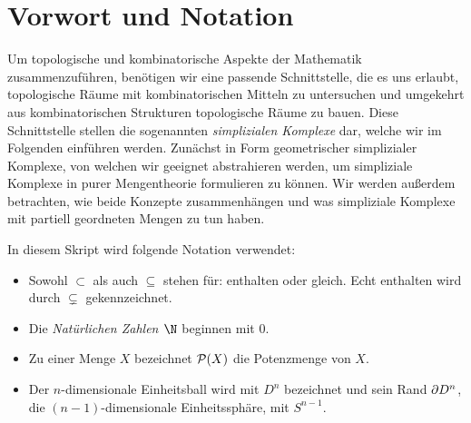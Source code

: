
\chapter{Vorwort und Notation}
Um topologische und kombinatorische Aspekte der Mathematik zusammenzuführen,
benötigen wir eine passende Schnittstelle, die es uns erlaubt, topologische
Räume mit kombinatorischen Mitteln zu untersuchen und umgekehrt aus
kombinatorischen Strukturen topologische Räume zu bauen. Diese Schnittstelle
stellen die sogenannten \emph{simplizialen Komplexe} dar, welche wir im
Folgenden einführen werden. Zunächst in Form geometrischer simplizialer
Komplexe, von welchen wir geeignet abstrahieren werden, um simpliziale Komplexe
in purer Mengentheorie formulieren zu können. Wir werden außerdem betrachten,
wie beide Konzepte zusammenhängen und was simpliziale Komplexe mit partiell
geordneten Mengen zu tun haben.


\bigskip
In diesem Skript wird folgende Notation verwendet:
\begin{itemize}
    \item
        Sowohl $\subset$ als auch $\subseteq$ stehen für: enthalten oder gleich.
        Echt enthalten wird durch $\subsetneq$ gekennzeichnet.
    
    \item
        Die \emph{Natürlichen Zahlen $\N$} beginnen mit $0$.
        
    \item
        Zu einer Menge $X$ bezeichnet $\operatorname{\mathcal{P}}(X)$ die Potenzmenge von $X$.

    \item %
        Der $n$-dimensionale Einheitsball wird mit $D^n$ bezeichnet und
        sein Rand $\partial D^n$, 
        die $(n-1)$-dimensionale Einheitssphäre, mit $S^{n-1}$.
\end{itemize}










